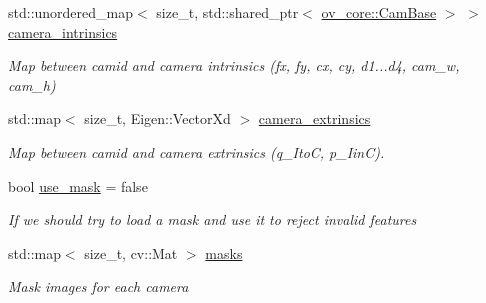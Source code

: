 \begin{DoxyCompactItemize}
\mbox{\label{structov__msckf_1_1VioManagerOptions_ae5855bbb2f0191344acd87e2dbd6d39b}} 
std\+::unordered\+\_\+map$<$ size\+\_\+t, std\+::shared\+\_\+ptr$<$ \hyperlink{classov__core_1_1CamBase}{ov\+\_\+core\+::\+Cam\+Base} $>$ $>$ \hyperlink{structov__msckf_1_1VioManagerOptions_ae5855bbb2f0191344acd87e2dbd6d39b}{camera\+\_\+intrinsics}
\begin{DoxyCompactList}\small\item\em Map between camid and camera intrinsics (fx, fy, cx, cy, d1...d4, cam\+\_\+w, cam\+\_\+h) \end{DoxyCompactList}\item 
\mbox{\label{structov__msckf_1_1VioManagerOptions_ab5cecc1b5cf69b6835d9af0df4496401}} 
std\+::map$<$ size\+\_\+t, Eigen\+::\+Vector\+Xd $>$ \hyperlink{structov__msckf_1_1VioManagerOptions_ab5cecc1b5cf69b6835d9af0df4496401}{camera\+\_\+extrinsics}
\begin{DoxyCompactList}\small\item\em Map between camid and camera extrinsics (q\+\_\+\+ItoC, p\+\_\+\+IinC). \end{DoxyCompactList}\item 
\mbox{\label{structov__msckf_1_1VioManagerOptions_a3b74f8ceb35bd36df62d0e2403adcd25}} 
bool \hyperlink{structov__msckf_1_1VioManagerOptions_a3b74f8ceb35bd36df62d0e2403adcd25}{use\+\_\+mask} = false
\begin{DoxyCompactList}\small\item\em If we should try to load a mask and use it to reject invalid features \end{DoxyCompactList}\item 
\mbox{\label{structov__msckf_1_1VioManagerOptions_ae4b385302e72d09d7c5abccb48a83442}} 
std\+::map$<$ size\+\_\+t, cv\+::\+Mat $>$ \hyperlink{structov__msckf_1_1VioManagerOptions_ae4b385302e72d09d7c5abccb48a83442}{masks}
\begin{DoxyCompactList}\small\item\em Mask images for each camera \end{DoxyCompactList}\item 
\mbox{\label{structov__msckf_1_1VioManagerOptions_af01535da59b1d2d5e3309aaa34e69c8e}} 

\end{DoxyCompactItemize}
